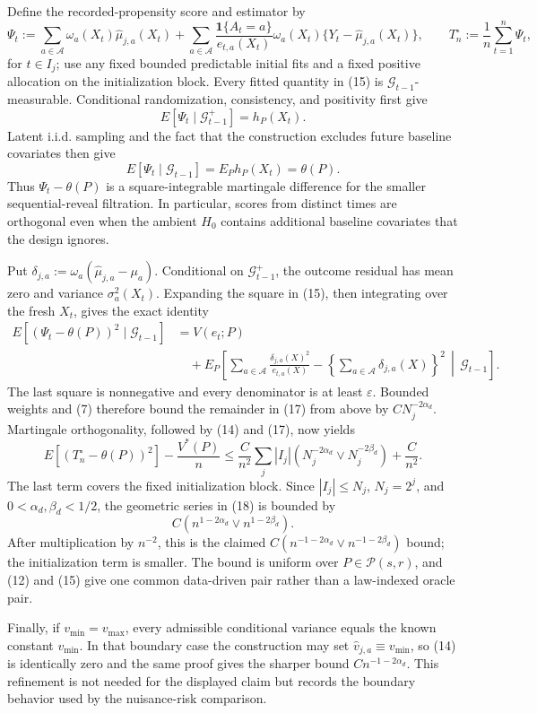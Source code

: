 Define the recorded-propensity score and estimator by
\[
\Psi_t:=
\sum_{a\in\mathcal A}\omega_a(X_t)\widehat\mu_{j,a}(X_t)
+\sum_{a\in\mathcal A}
\frac{\mathbf 1\{A_t=a\}}{e_{t,a}(X_t)}
\omega_a(X_t)\{Y_t-\widehat\mu_{j,a}(X_t)\},
\qquad
T_n^{\circ}:=\frac1n\sum_{t=1}^n\Psi_t,
\tag{15}
\]
for \(t\in I_j\); use any fixed bounded predictable initial fits and a fixed positive allocation on the initialization block.  Every fitted quantity in (15) is \(\mathcal G_{t-1}\)-measurable.  Conditional randomization, consistency, and positivity first give
\[
E[\Psi_t\mid\mathcal G_{t-1}^{+}]=h_P(X_t).
\]
Latent i.i.d. sampling and the fact that the construction excludes future baseline covariates then give
\[
E[\Psi_t\mid\mathcal G_{t-1}]=E_P h_P(X_t)=\theta(P).
\tag{16}
\]
Thus \(\Psi_t-\theta(P)\) is a square-integrable martingale difference for the smaller sequential-reveal filtration.  In particular, scores from distinct times are orthogonal even when the ambient \(H_0\) contains additional baseline covariates that the design ignores.

Put \(\delta_{j,a}:=\omega_a(\widehat\mu_{j,a}-\mu_a)\).  Conditional on \(\mathcal G_{t-1}^{+}\), the outcome residual has mean zero and variance \(\sigma_a^2(X_t)\).  Expanding the square in (15), then integrating over the fresh \(X_t\), gives the exact identity
\[
\begin{aligned}
E[(\Psi_t-\theta(P))^2\mid\mathcal G_{t-1}]
&=V(e_t;P)\\
&\quad+E_P\!\left[
\sum_{a\in\mathcal A}\frac{\delta_{j,a}(X)^2}{e_{t,a}(X)}
-\left\{\sum_{a\in\mathcal A}\delta_{j,a}(X)\right\}^2
\,\middle|\,\mathcal G_{t-1}\right].
\end{aligned}
\tag{17}
\]
The last square is nonnegative and every denominator is at least \(\varepsilon\).  Bounded weights and (7) therefore bound the remainder in (17) from above by \(CN_j^{-2\alpha_d}\).  Martingale orthogonality, followed by (14) and (17), now yields
\[
E[(T_n^{\circ}-\theta(P))^2]-\frac{V^*(P)}n
\leq \frac{C}{n^2}\sum_j |I_j|
\left(N_j^{-2\alpha_d}\vee N_j^{-2\beta_d}\right)
+\frac{C}{n^2}.
\tag{18}
\]
The last term covers the fixed initialization block.  Since \(|I_j|\leq N_j\), \(N_j=2^j\), and \(0<\alpha_d,\beta_d<1/2\), the geometric series in (18) is bounded by
\[
C\left(n^{1-2\alpha_d}\vee n^{1-2\beta_d}\right).
\]
After multiplication by \(n^{-2}\), this is the claimed
\(C(n^{-1-2\alpha_d}\vee n^{-1-2\beta_d})\) bound; the initialization term is smaller.  The bound is uniform over \(P\in\mathcal P(s,r)\), and (12) and (15) give one common data-driven pair rather than a law-indexed oracle pair.

Finally, if \(v_{\min}=v_{\max}\), every admissible conditional variance equals the known constant \(v_{\min}\).  In that boundary case the construction may set \(\widehat v_{j,a}\equiv v_{\min}\), so (14) is identically zero and the same proof gives the sharper bound \(Cn^{-1-2\alpha_d}\).  This refinement is not needed for the displayed claim but records the boundary behavior used by the nuisance-risk comparison.